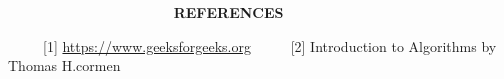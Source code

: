\documentclass[10pt]{report}
\begin{document}
\begin{multicols}{2}
\vspace{\baselineskip}

\vspace{\baselineskip}

\vspace{\baselineskip}

\vspace{\baselineskip}

\vspace{\baselineskip}

\vspace{\baselineskip}
\textbf{\ \ \ \ \ \ \ \ \ \ \  \ \ \ \ \ \ \  }
\textbf{\ \  R}{\fontsize{8pt}{9.6pt}\selectfont \textbf{EFERENCES}}\textbf{\ \ \  }

\vspace{\baselineskip}
{\fontsize{9pt}{10.8pt}\selectfont \ \ \ \ \ [1]  \href{https://www.geeksforgeeks.org}{https://www.geeksforgeeks.org}}
{\fontsize{9pt}{10.8pt}\selectfont \ \ \ \ \ [2]  Introduction to Algorithms by Thomas H.cormen}
{\fontsize{9pt}{10.8pt}\selectfont \  }

\end{multicols}
\printbibliography
\end{document}
